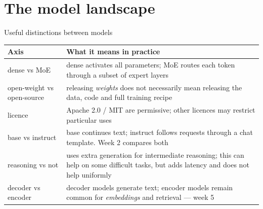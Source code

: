 \documentclass[aspectratio=169,10pt]{beamer}
\begin{document}
\section{The model landscape}

\begin{frame}[shrink=3]{Useful distinctions between models}
  \centering
  \small
  \renewcommand{\arraystretch}{1.08}
  \begin{tabular}{@{}L{3.2cm} L{9.3cm}@{}}
    \toprule
    \textbf{Axis} & \textbf{What it means in practice}\\
    \midrule
    dense vs MoE & dense activates all parameters; MoE routes each token through a subset of expert layers\\
    \addlinespace[0.35em]
    open-weight vs open-source & releasing \emph{weights} does not necessarily
      mean releasing the data, code and full training recipe\\
    \addlinespace[0.35em]
    licence & Apache 2.0 / MIT are permissive; other licences may restrict particular uses\\
    \addlinespace[0.35em]
    base vs instruct & base continues text; instruct follows requests through a chat template. Week 2 compares both\\
    \addlinespace[0.35em]
    reasoning vs not & uses extra generation for intermediate reasoning; this
      can help on some difficult tasks, but adds latency and does not help uniformly\\
    \addlinespace[0.35em]
    decoder vs encoder & decoder models generate text; encoder models remain
      common for \emph{embeddings} and retrieval --- week 5\\
    \bottomrule
  \end{tabular}
\end{frame}
\end{document}
